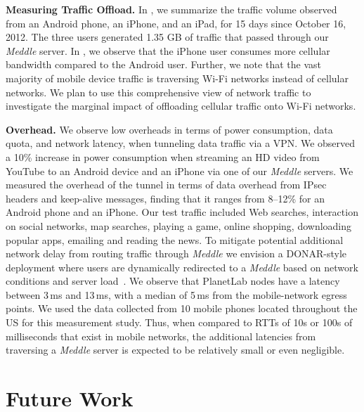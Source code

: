 \documentclass{sig-alternate}
\newcommand{\meddle}{{\em Meddle}\xspace}
\renewcommand{\fref}{\Fref}
\begin{document}
\textbf{Measuring Traffic Offload.} In \fref{tab:Usage}, we summarize
the traffic volume observed from an Android phone, an
iPhone, and an iPad, for 15 days since October 16, 2012. The three users
generated 1.35 GB of traffic that passed through our \meddle
server. In \fref{tab:Usage}, we observe that the iPhone user consumes
more cellular bandwidth compared to the Android user.  Further, we note that the vast majority of
mobile device traffic is traversing Wi-Fi networks instead of cellular
networks. We plan to use this
comprehensive view of network traffic to investigate the marginal impact of offloading 
cellular traffic onto Wi-Fi networks. 

\textbf{Overhead.} We observe low overheads in terms of power
consumption, data quota, and network latency, when tunneling data
traffic via a VPN. We observed a 10\% increase in power consumption
when streaming an HD video from YouTube to an Android device and an
iPhone via one of our \meddle servers. We measured the overhead of the
tunnel in terms of data overhead from IPsec headers and keep-alive
messages, finding that it ranges from 8--12\% for an Android phone and
an iPhone. Our test traffic included Web searches, interaction on
social networks, map searches, playing a game, online shopping,
downloading popular apps, emailing and reading the news. To mitigate
potential additional network delay from routing traffic through
\meddle we envision a DONAR-style deployment where users are
dynamically redirected to a \meddle based on network
conditions and server load~\cite{wendell:donar}. We observe that
PlanetLab nodes have a latency between 3\,ms and 13\,ms, with a median
of 5\,ms from the mobile-network egress points. We used the data
collected from 10 mobile phones located throughout the US for this
measurement study. Thus, when compared to RTTs of 10s or 100s of
milliseconds that exist in mobile networks, the additional latencies
from traversing a \meddle server is expected to be relatively small or
even negligible.  

\section{Future Work}

\end{document}
